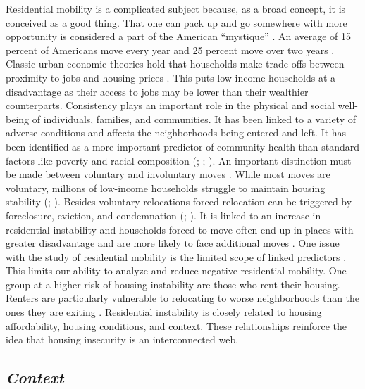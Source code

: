 Residential mobility is a complicated subject because, as a broad concept, it is conceived as a good thing. That one can pack up and go somewhere with more opportunity is considered a part of the American “mystique” \citep{molloy_internal_2011}. An average of 15 percent of Americans move every year and 25 percent move over two years \citep{bachmann_ins_2014}. Classic urban economic theories hold that households make trade-offs between proximity to jobs and housing prices \citep{hu_housing_2019}. This puts low-income households at a disadvantage as their access to jobs may be lower than their wealthier counterparts. Consistency plays an important role in the physical and social well-being of individuals, families, and communities. It has been linked to a variety of adverse conditions and affects the neighborhoods being entered and left. It has been identified as a more important predictor of community health than standard factors like poverty and racial composition (\citealp{desmond_forced_2015}; \citealp{desmond_housing_2016}; \citealp{rauh_housing_2008}). An important distinction must be made between voluntary and involuntary moves \citep{siskar_who_2019}. While most moves are voluntary, millions of low-income households struggle to maintain housing stability (\citealp{phinney_exploring_2013}; \citealp{kang_why_2019}). Besides voluntary relocations forced relocation can be triggered by foreclosure, eviction, and condemnation (\citealp{phinney_exploring_2013}; \citealp{siskar_who_2019}). It is linked to an increase in residential instability and households forced to move often end up in places with greater disadvantage and are more likely to face additional moves \citep{desmond_forced_2015-1}. One issue with the study of residential mobility is the limited scope of linked predictors \citep{kang_why_2019}. This limits our ability to analyze and reduce negative residential mobility. One group at a higher risk of housing instability are those who rent their housing. Renters are particularly vulnerable to relocating to worse neighborhoods than the ones they are exiting \citep{desmond_forced_2015}. Residential instability is closely related to housing affordability, housing conditions, and context. These relationships reinforce the idea that housing insecurity is an interconnected web. 

 

\subsection{\textit{Context}} 


